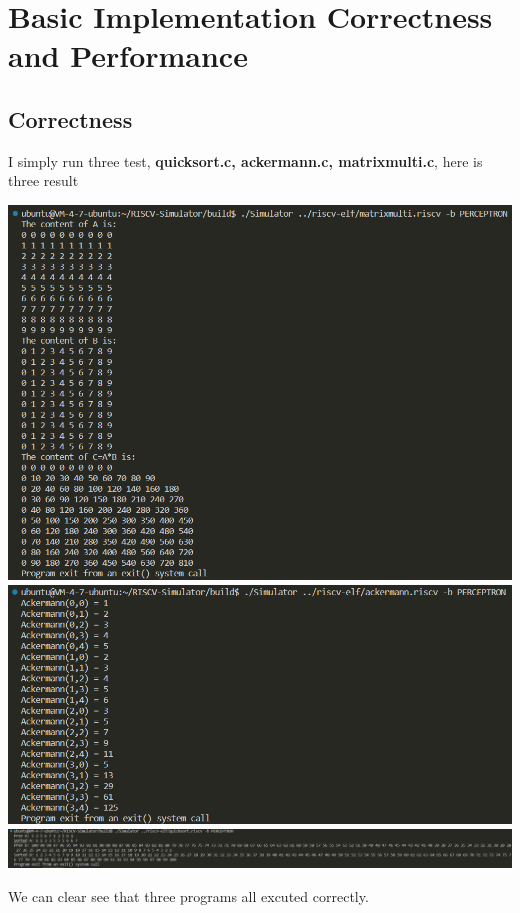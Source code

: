 \documentclass{article}
\begin{document}
\section{Basic Implementation Correctness and Performance}
\subsection{Correctness}
I simply run three test, \textbf{quicksort.c, ackermann.c, matrixmulti.c}, here is three result\\
\begin{center}
  \includegraphics[scale = 0.4]{correctness matrix.png}\\
  \includegraphics[scale = 0.4]{correctness acker.png}\\
  \includegraphics[scale = 0.25]{correctness quick.png}
\end{center}
We can clear see that three programs all excuted correctly.
\end{document}
